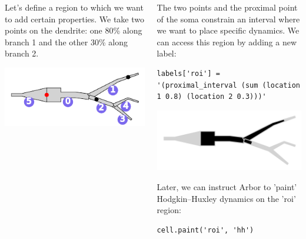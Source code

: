 \documentclass{beamer}
\newcommand*\circled[1]{\tikz[baseline=(char.base)]{\node[shape=circle,fill,inner sep=2pt] (char) {\textcolor{white}{#1}};}} %
\begin{document}
\begin{frame}[t, fragile]
\begin{columns}[onlytextwidth,T]
\begin{column}{0.33\textwidth}
          Let's define a region to which we want to add certain properties. We take two points {\color{black}\circled{-}} on the dendrite: one 80\% along branch 1 and the other 30\% along branch 2.
          \begin{center}\includegraphics[width=0.8\linewidth]{scripts/branches.pdf}\end{center}
        \end{column}

        \begin{column}{0.3\textwidth}
          \circled{3} The two points and the proximal point of the soma constrain an interval where we want to place specific dynamics. We can access this region by adding a new label:
\begin{verbatim}
labels['roi'] = '(proximal_interval (sum (location 1 0.8) (location 2 0.3)))'
\end{verbatim}
          \begin{center}\includegraphics[width=0.8\linewidth]{scripts/region.pdf}\end{center}
          Later, we can instruct Arbor to 'paint' Hodgkin–Huxley dynamics on the 'roi' region:
\begin{verbatim}
cell.paint('roi', 'hh')
\end{verbatim}
        \end{column}

      \end{columns}


\end{frame}
\end{document}
